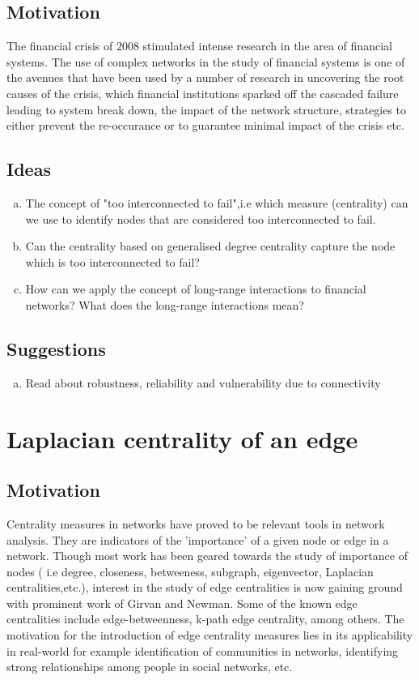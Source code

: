 \documentclass[10pt,a4paper]{article}
\begin{document}
    \subsection{Motivation}
    The financial crisis of $2008$ stimulated intense research in the area of financial systems. The use of complex networks in the study of financial systems is one of the avenues that have been used by a number of research in uncovering the root causes of the crisis, which financial institutions sparked off the cascaded failure leading to system break down, the impact of the network structure, strategies to  either prevent the re-occurance or to guarantee minimal impact of the crisis etc. 
    \subsection{Ideas}
    \begin{enumerate}[a)]
    	\item The concept of "too interconnected to fail",i.e which measure (centrality) can we use to identify nodes that are considered too interconnected to fail.
    	\item Can the centrality based on generalised degree centrality capture the node which is too interconnected to fail?
    	\item How can we apply the concept of long-range interactions to financial networks? What does the long-range interactions mean?
    \end{enumerate}
    \subsection{Suggestions}
    
    \begin{enumerate}[a)]
    	\item  Read about robustness, reliability and vulnerability due to connectivity
    \end{enumerate}

	\section{Laplacian centrality of an edge}
	\subsection{Motivation}
	Centrality measures in networks have proved to be relevant tools in network analysis. They are indicators of the 'importance' of a given node or edge in a network. Though most work has been geared towards the study of importance of nodes ( i.e degree, closeness, betweeness, subgraph, eigenvector, Laplacian centralities,etc.), interest in the study of edge centralities is now gaining ground with prominent work of  Girvan and Newman. Some of the known edge centralities include edge-betweenness, k-path edge centrality, among others. The motivation for the introduction of edge centrality measures lies in its applicability in real-world for example identification of communities in networks, identifying strong relationships among people in social networks, etc. 
\end{document}
